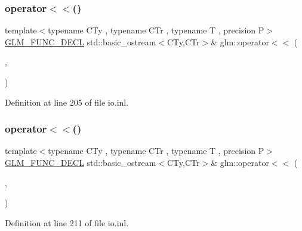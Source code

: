 \subsubsection{\texorpdfstring{operator$<$$<$()}{operator<<()}\hspace{0.1cm}{\footnotesize\ttfamily [2/15]}}
{\footnotesize\ttfamily template$<$typename C\+Ty , typename C\+Tr , typename T , precision P$>$ \\
\mbox{\hyperlink{setup_8hpp_ab2d052de21a70539923e9bcbf6e83a51}{G\+L\+M\+\_\+\+F\+U\+N\+C\+\_\+\+D\+E\+CL}} std\+::basic\+\_\+ostream$<$C\+Ty,C\+Tr$>$\& glm\+::operator$<$$<$ (\begin{DoxyParamCaption}\item[{std\+::basic\+\_\+ostream$<$ C\+Ty, C\+Tr $>$ \&}]{,  }\item[{\mbox{\hyperlink{structglm_1_1tvec1}{tvec1}}$<$ T, P $>$ const \&}]{ }\end{DoxyParamCaption})}



Definition at line 205 of file io.\+inl.

\mbox{\label{group__gtx__io_ga0a3bca262adbba991f394d8d3d52e10d}} 
\subsubsection{\texorpdfstring{operator$<$$<$()}{operator<<()}\hspace{0.1cm}{\footnotesize\ttfamily [3/15]}}
{\footnotesize\ttfamily template$<$typename C\+Ty , typename C\+Tr , typename T , precision P$>$ \\
\mbox{\hyperlink{setup_8hpp_ab2d052de21a70539923e9bcbf6e83a51}{G\+L\+M\+\_\+\+F\+U\+N\+C\+\_\+\+D\+E\+CL}} std\+::basic\+\_\+ostream$<$C\+Ty,C\+Tr$>$\& glm\+::operator$<$$<$ (\begin{DoxyParamCaption}\item[{std\+::basic\+\_\+ostream$<$ C\+Ty, C\+Tr $>$ \&}]{,  }\item[{\mbox{\hyperlink{structglm_1_1tvec2}{tvec2}}$<$ T, P $>$ const \&}]{ }\end{DoxyParamCaption})}



Definition at line 211 of file io.\+inl.

\mbox{\label{group__gtx__io_ga0d6cfb5d138639b90f18d7bbb2a4ae56}} 
